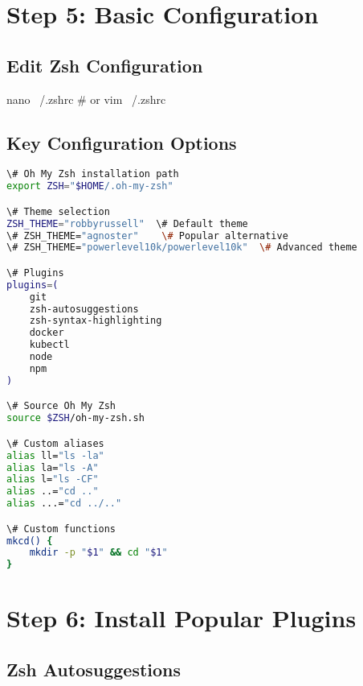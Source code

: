 \documentclass{article}
\begin{document}
\section{Step 5: Basic Configuration}

\subsection{Edit Zsh Configuration}

\begin{codebox}
nano ~/.zshrc
\# or
vim ~/.zshrc
\end{codebox}

\subsection{Key Configuration Options}

\begin{lstlisting}[language=bash, caption=Basic .zshrc configuration]
\# Oh My Zsh installation path
export ZSH="$HOME/.oh-my-zsh"

\# Theme selection
ZSH_THEME="robbyrussell"  \# Default theme
\# ZSH_THEME="agnoster"    \# Popular alternative
\# ZSH_THEME="powerlevel10k/powerlevel10k"  \# Advanced theme

\# Plugins
plugins=(
    git
    zsh-autosuggestions
    zsh-syntax-highlighting
    docker
    kubectl
    node
    npm
)

\# Source Oh My Zsh
source $ZSH/oh-my-zsh.sh

\# Custom aliases
alias ll="ls -la"
alias la="ls -A"
alias l="ls -CF"
alias ..="cd .."
alias ...="cd ../.."

\# Custom functions
mkcd() {
    mkdir -p "$1" && cd "$1"
}
\end{lstlisting}

\section{Step 6: Install Popular Plugins}

\subsection{Zsh Autosuggestions}

\end{document}
